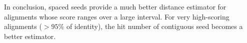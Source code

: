 \documentclass[portrait,final,a0paper,fontscale=0.277]{baposter}
\begin{document}
\begin{poster}
{%
% 
% 
 In conclusion, spaced seeds provide a much better
 distance estimator for alignments whose score ranges over a large interval. For
 very high-scoring alignments (${>95\%}$ of identity), the hit number of
 contiguous seed becomes a better estimator. 
 
 \vspace{0.3em}
  }


\end{poster}
\end{document}

